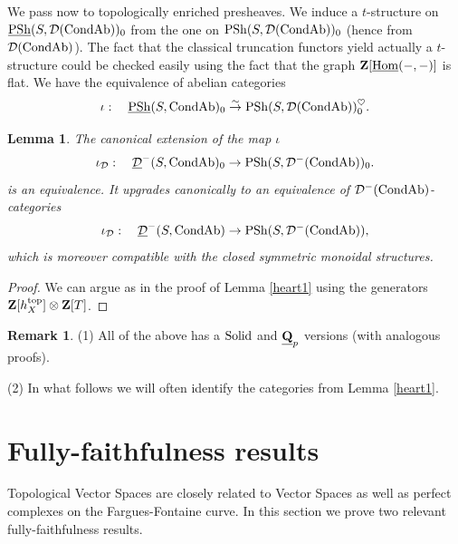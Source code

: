 \documentclass[10pt]{amsart}
\newtheorem{lemma}[equation]{Lemma}
\theoremstyle{definition}
\newtheorem{remark}[equation]{Remark}
\theoremstyle{remark}
\newcommand{\uHom}{\underline{{\rm{Hom}} }}
\newcommand{\sd}{{\mathcal{D}}}
\numberwithin{equation}{section}
\def\Q{{\bf Q}} \def\Z{{\bf Z}}
\numberwithin{equation}{section}
\begin{document}
  We pass now to topologically enriched presheaves. We induce a $t$-structure on $\underline{\rm PSh}(S,\sd({\rm CondAb}))_0$ from the one on ${\rm PSh}(S,\sd({\rm CondAb}))_0$ (hence from $\sd({\rm CondAb})$).  The fact that the classical truncation functors yield actually a $t$-structure could be checked easily using the fact that the graph $\Z[\uHom(-,-)]$ is flat.   We have the equivalence of abelian categories
$$\iota: \quad \underline{\rm PSh}(S,{\rm CondAb})_0\stackrel{\sim}{\to}{{\rm PSh}}(S,\sd({\rm CondAb}))^{\heartsuit}_0.
$$
\begin{lemma}\label{heart2}The canonical extension of the map $\iota$
$$
\iota_{\sd}:\quad \underline{\sd}^{-}(S,{\rm CondAb})_0\to {{\rm PSh}}(S,\sd^{-}({\rm CondAb}))_0.
$$
is an equivalence. It upgrades canonically to an equivalence of $\sd^{-}({\rm CondAb})$-categories
$$
\iota_{\sd}:\quad \underline{\sd}^{-}(S,{\rm CondAb})\to {{\rm PSh}}(S,\sd^{-}({\rm CondAb})),
$$
 which is moreover compatible with the closed symmetric monoidal structures.
\end{lemma}
\begin{proof}We can argue as in the proof of Lemma \ref{heart1} using the generators $\Z[h^{\rm top}_X]\otimes\Z[T]$. 
\end{proof}
\begin{remark}
(1) All of the above has a ${\rm Solid}$ and $\underline{\Q}_p$ versions (with analogous proofs). 

 (2) In what follows we will often identify the categories from Lemma \ref{heart1}. 

\end{remark}
 \section{Fully-faithfulness results}\label{lato25S}
Topological Vector Spaces  are closely related to Vector Spaces as well as perfect complexes on the Fargues-Fontaine curve. In this section we prove two relevant fully-faithfulness results. 
\end{document}
